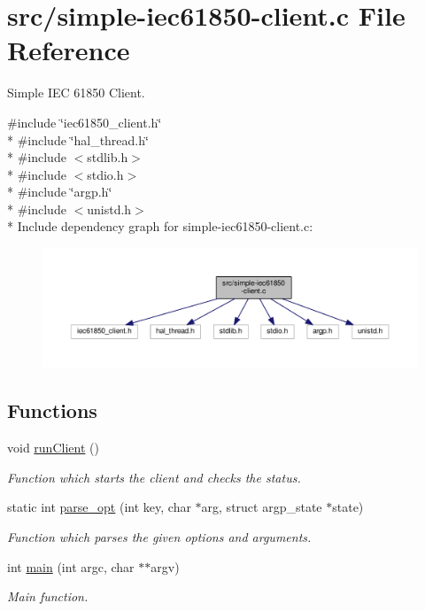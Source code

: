 \hypertarget{simple-iec61850-client_8c}{}\section{src/simple-\/iec61850-\/client.c File Reference}
\label{simple-iec61850-client_8c}


Simple I\+EC 61850 Client.  


{\ttfamily \#include \char`\"{}iec61850\+\_\+client.\+h\char`\"{}}\\*
{\ttfamily \#include \char`\"{}hal\+\_\+thread.\+h\char`\"{}}\\*
{\ttfamily \#include $<$stdlib.\+h$>$}\\*
{\ttfamily \#include $<$stdio.\+h$>$}\\*
{\ttfamily \#include \char`\"{}argp.\+h\char`\"{}}\\*
{\ttfamily \#include $<$unistd.\+h$>$}\\*
Include dependency graph for simple-\/iec61850-\/client.c\+:\nopagebreak
\begin{figure}[H]
\begin{center}
\leavevmode
\includegraphics[width=350pt]{simple-iec61850-client_8c__incl}
\end{center}
\end{figure}
\subsection*{Functions}
\begin{DoxyCompactItemize}
\item 
void \hyperlink{simple-iec61850-client_8c_a19c4ac63742805a0bfd8fc4a512b42d3}{run\+Client} ()
\begin{DoxyCompactList}\small\item\em Function which starts the client and checks the status. \end{DoxyCompactList}\item 
static int \hyperlink{simple-iec61850-client_8c_aaf7bc24f3891f0c63a6043f4dc2ab311}{parse\+\_\+opt} (int key, char $\ast$arg, struct argp\+\_\+state $\ast$state)
\begin{DoxyCompactList}\small\item\em Function which parses the given options and arguments. \end{DoxyCompactList}\item 
int \hyperlink{simple-iec61850-client_8c_a3c04138a5bfe5d72780bb7e82a18e627}{main} (int argc, char $\ast$$\ast$argv)
\begin{DoxyCompactList}\small\item\em Main function. \end{DoxyCompactList}\end{DoxyCompactItemize}
